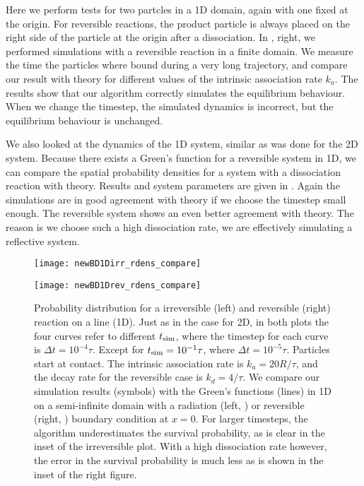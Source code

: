 Here we perform tests for two partcles in a 1D domain, again with one fixed at the origin. For reversible reactions, the product particle is always placed on the right side of the particle at the origin after a dissociation. In , right, we performed simulations with a reversible reaction in a finite domain. We measure the time the particles where bound during a very long trajectory, and compare our result with theory for different values of the intrinsic association rate $k_a$. The results show that our algorithm correctly simulates the equilibrium behaviour. When we change the timestep, the simulated dynamics is incorrect, but the equilibrium behaviour is unchanged.

We also looked at the dynamics of the 1D system, similar as was done for the 2D system. Because there exists a Green's function for a reversible system in 1D, we can compare the spatial probability densities for a system with a dissociation reaction with theory. Results and system parameters are given in . Again the simulations are in good agreement with theory if we choose the timestep small enough. The reversible system shows an even better agreement with theory. The reason is we choose such a high dissociation rate, we are effectively simulating a reflective system.

\begin{figure}[hb]
\begin{minipage}[ht]{.5\linewidth}
\centering
\texttt{[image: newBD1Dirr\_rdens\_compare]}
\end{minipage}
\begin{minipage}[ht]{.5\linewidth}
\centering
\texttt{[image: newBD1Drev\_rdens\_compare]}
\end{minipage}
\caption{ Probability distribution for a irreversible (left) and reversible (right) reaction on a line (1D). Just as in the case for 2D, in both plots the four curves refer to different $t_{\rm sim}$, where the timestep for each curve is $\Delta t = 10^{-4} \tau$. Except for $t_{\rm sim}=10^{-1}\tau$, where $\Delta t=10^{-5}\tau$. Particles start at contact. The intrinsic association rate is $k_a=20 R/\tau$, and the decay rate for the reversible case is $k_d=4/\tau$. We compare our simulation results (symbols) with the Green's functions (lines) in 1D on a semi-infinite domain with a radiation (left, \cite{Beck1992}) or reversible (right, \cite{Agmon1984,Kim2001}) boundary condition at $x=0$. For larger timesteps, the algorithm underestimates the survival probability, as is clear in the inset of the irreversible plot. With a high dissociation rate however, the error in the survival probability is much less as is shown in the inset of the right figure.}
\end{figure}

